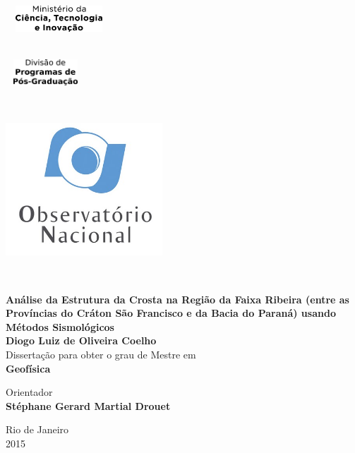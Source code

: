\setcounter{page}{1} 


\thispagestyle{empty}
\begin{flushleft} ~\\ \vspace{-10mm} \hspace{-5mm}  \includegraphics[width=40mm, height=10mm]{mcti} 
\begin{flushright}~\\ \vspace{-20mm} \hspace{-9mm}  \includegraphics[width=30mm, height=10mm]{dppg} 
\end{flushright}


~\\ \begin{center} \includegraphics[height=50mm]{logo_on}  \end{center} %
~\\ \vspace{5mm}
\begin{centering}
\LARGE \textbf{Análise da Estrutura da Crosta na Região da Faixa Ribeira (entre as Províncias do Cráton São Francisco e da Bacia do Paraná) usando Métodos Sismológicos}
\\ \vspace{20mm}
\Large \textbf{Diogo Luiz de Oliveira Coelho} \\
\vspace{20mm}
\Large Dissertação para obter o grau de Mestre em
\\ \vspace{2mm}
\LARGE \textbf{Geofísica}
\\ \vspace{20mm}

\Large Orientador\\
\textbf{Stéphane Gerard Martial Drouet} \\

 
\vspace{20mm}

Rio de Janeiro \\
2015 \\
\end{centering}
\let\thepage\relax
\end{flushleft}
\pagebreak